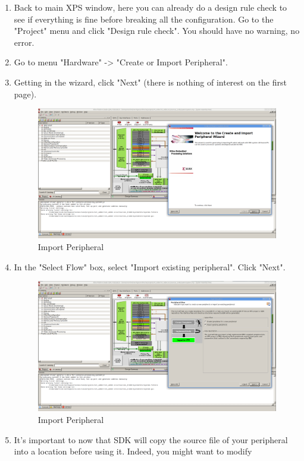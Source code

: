 \documentclass{article}
\begin{document}
\begin{enumerate}
	\item Back to main XPS window, here you can already do a design rule check to see if everything is fine
	before breaking all the configuration. Go to the "Project" menu and click
	"Design rule check". You should have no warning, no error.
	\item Go to menu "Hardware" -> "Create or Import Peripheral".
	\item Getting in the wizard, click "Next" (there is nothing of interest on the
			first page).
	\begin{figure}
	\includegraphics[scale=0.25]{pictures/ImportPeripheral1.png}
	\caption{Import Peripheral}
	\end{figure}
	\item In the "Select Flow" box, select "Import existing peripheral". Click
	"Next".
	\begin{figure}
	\includegraphics[scale=0.25]{pictures/ImportPeripheral2.png}
	\caption{Import Peripheral}
	\end{figure}
	\item It's important to now that SDK will copy the source file of your
	peripheral into a location before using it. Indeed, you might want to modify

\end{enumerate}
\end{document}
